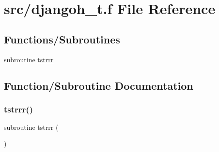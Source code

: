 \hypertarget{djangoh__t_8f}{}\section{src/djangoh\+\_\+t.f File Reference}
\label{djangoh__t_8f}
\subsection*{Functions/\+Subroutines}
\begin{DoxyCompactItemize}
\item 
subroutine \hyperlink{djangoh__t_8f_a23aba6b49c1d6068360e7a560073a051}{tstrrr}
\end{DoxyCompactItemize}


\subsection{Function/\+Subroutine Documentation}
\mbox{\label{djangoh__t_8f_a23aba6b49c1d6068360e7a560073a051}} 
\subsubsection{\texorpdfstring{tstrrr()}{tstrrr()}}
{\footnotesize\ttfamily subroutine tstrrr (\begin{DoxyParamCaption}{ }\end{DoxyParamCaption})}

